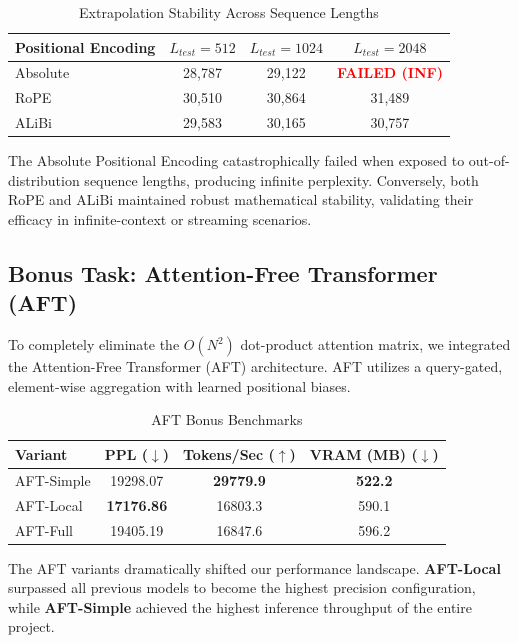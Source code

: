 \documentclass[11pt,a4paper]{article}
\begin{document}
\begin{table}[h]
    \centering
    \caption{Extrapolation Stability Across Sequence Lengths}
    \begin{tabular}{lccc}
        \toprule
        \textbf{Positional Encoding} & $L_{test} = 512$ & $L_{test} = 1024$ & $L_{test} = 2048$ \\
        \midrule
        Absolute & 28,787 & 29,122 & \textcolor{red}{\textbf{FAILED (INF)}} \\
        RoPE & 30,510 & 30,864 & 31,489 \\
        ALiBi & 29,583 & 30,165 & 30,757 \\
        \bottomrule
    \end{tabular}
    \label{tab:extrapolation}
\end{table}

The Absolute Positional Encoding catastrophically failed when exposed to out-of-distribution sequence lengths, producing infinite perplexity. Conversely, both RoPE and ALiBi maintained robust mathematical stability, validating their efficacy in infinite-context or streaming scenarios.

\subsection{Bonus Task: Attention-Free Transformer (AFT)}
To completely eliminate the $O(N^2)$ dot-product attention matrix, we integrated the Attention-Free Transformer (AFT) architecture. AFT utilizes a query-gated, element-wise aggregation with learned positional biases.

\begin{table}[h]
    \centering
    \caption{AFT Bonus Benchmarks}
    \begin{tabular}{lccc}
        \toprule
        \textbf{Variant} & \textbf{PPL} ($\downarrow$) & \textbf{Tokens/Sec} ($\uparrow$) & \textbf{VRAM (MB)} ($\downarrow$) \\
        \midrule
        AFT-Simple & 19298.07 & \textbf{29779.9} & \textbf{522.2} \\
        AFT-Local  & \textbf{17176.86} & 16803.3 & 590.1 \\
        AFT-Full   & 19405.19 & 16847.6 & 596.2 \\
        \bottomrule
    \end{tabular}
    \label{tab:aft_benchmarks}
\end{table}

The AFT variants dramatically shifted our performance landscape. \textbf{AFT-Local} surpassed all previous models to become the highest precision configuration, while \textbf{AFT-Simple} achieved the highest inference throughput of the entire project.
\end{document}
